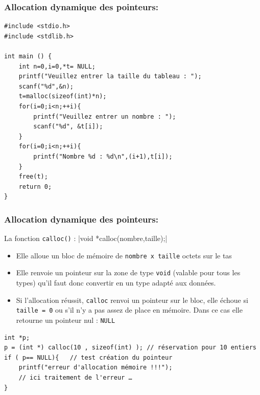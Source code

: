 \documentclass{beamer}
\begin{document}
\begin{frame}[fragile]
\frametitle{Allocation dynamique des pointeurs:}
\begin{verbatim}
#include <stdio.h>
#include <stdlib.h>

int main () {
    int n=0,i=0,*t= NULL;
    printf("Veuillez entrer la taille du tableau : ");
    scanf("%d",&n);
    t=malloc(sizeof(int)*n);
    for(i=0;i<n;++i){
        printf("Veuillez entrer un nombre : ");
        scanf("%d", &t[i]);
    }
    for(i=0;i<n;++i){
        printf("Nombre %d : %d\n",(i+1),t[i]);
    }
    free(t);
    return 0;
}

\end{verbatim}
\end{frame}


\begin{frame}[fragile]
\frametitle{Allocation dynamique des pointeurs:}
La fonction {\tt calloc()} : 
|void *calloc(nombre,taille);|
\begin{itemize}
\item Elle alloue un bloc de mémoire de {\tt nombre x taille} octets sur le tas
\item Elle renvoie un pointeur sur la zone de type {\tt void} (valable pour tous les types) qu'il faut donc convertir en un type adapté aux données.
\item Si l'allocation réussit, {\tt calloc} renvoi un pointeur sur le bloc, elle échoue si {\tt taille = 0} ou s'il n'y a pas assez de place en mémoire. Dans ce cas elle retourne un pointeur nul : {\tt NULL}
\end{itemize}
\begin{verbatim}
int *p;
p = (int *) calloc(10 , sizeof(int) ); // réservation pour 10 entiers
if ( p== NULL){   // test création du pointeur	
	printf("erreur d'allocation mémoire !!!");
	// ici traitement de l'erreur …
} 
\end{verbatim}
\end{frame}

\end{document}
